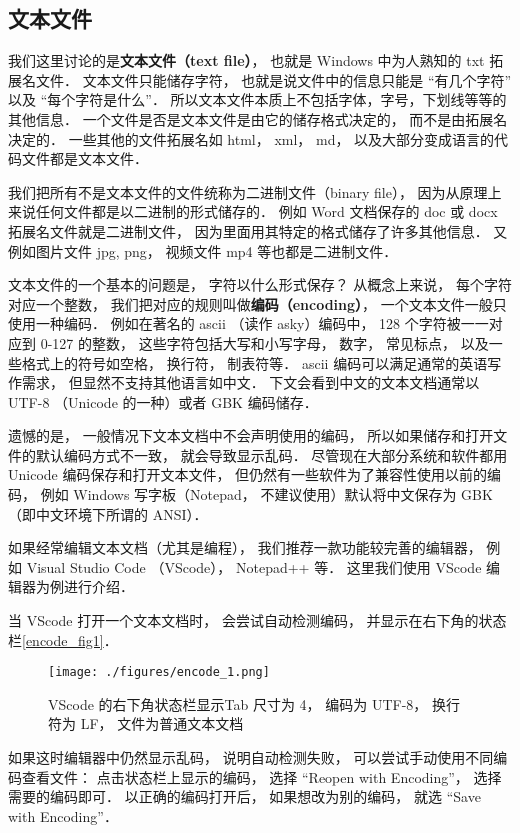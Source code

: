 
\subsection{文本文件}
我们这里讨论的是\textbf{文本文件（text file）}， 也就是 Windows 中为人熟知的 txt 拓展名文件． 文本文件只能储存字符， 也就是说文件中的信息只能是 “有几个字符” 以及 “每个字符是什么”． 所以文本文件本质上不包括字体，字号，下划线等等的其他信息． 一个文件是否是文本文件是由它的储存格式决定的， 而不是由拓展名决定的． 一些其他的文件拓展名如 html， xml， md， 以及大部分变成语言的代码文件都是文本文件．

我们把所有不是文本文件的文件统称为二进制文件（binary file）， 因为从原理上来说任何文件都是以二进制的形式储存的． 例如 Word 文档保存的 doc 或 docx 拓展名文件就是二进制文件， 因为里面用其特定的格式储存了许多其他信息．  又例如图片文件 jpg, png， 视频文件 mp4 等也都是二进制文件．

文本文件的一个基本的问题是， 字符以什么形式保存？ 从概念上来说， 每个字符对应一个整数， 我们把对应的规则叫做\textbf{编码（encoding）}， 一个文本文件一般只使用一种编码． 例如在著名的 ascii （读作 asky）编码中， 128 个字符被一一对应到 0-127 的整数， 这些字符包括大写和小写字母， 数字， 常见标点， 以及一些格式上的符号如空格， 换行符， 制表符等． ascii 编码可以满足通常的英语写作需求， 但显然不支持其他语言如中文． 下文会看到中文的文本文档通常以 UTF-8 （Unicode 的一种）或者 GBK 编码储存．

遗憾的是， 一般情况下文本文档中不会声明使用的编码， 所以如果储存和打开文件的默认编码方式不一致， 就会导致显示乱码． 尽管现在大部分系统和软件都用 Unicode 编码保存和打开文本文件， 但仍然有一些软件为了兼容性使用以前的编码， 例如 Windows 写字板（Notepad， 不建议使用）默认将中文保存为 GBK（即中文环境下所谓的 ANSI）．

如果经常编辑文本文档（尤其是编程）， 我们推荐一款功能较完善的编辑器， 例如 Visual Studio Code （VScode）， Notepad++ 等． 这里我们使用 VScode 编辑器为例进行介绍．

当 VScode 打开一个文本文档时， 会尝试自动检测编码， 并显示在右下角的状态栏\autoref{encode_fig1}．
\begin{figure}[ht]
\centering
\texttt{[image: ./figures/encode\_1.png]}
\caption{VScode 的右下角状态栏显示Tab 尺寸为 4， 编码为 UTF-8， 换行符为 LF， 文件为普通文本文档} \label{encode_fig1}
\end{figure}
如果这时编辑器中仍然显示乱码， 说明自动检测失败， 可以尝试手动使用不同编码查看文件： 点击状态栏上显示的编码， 选择 “Reopen with Encoding”， 选择需要的编码即可． 以正确的编码打开后， 如果想改为别的编码， 就选 “Save with Encoding”．

